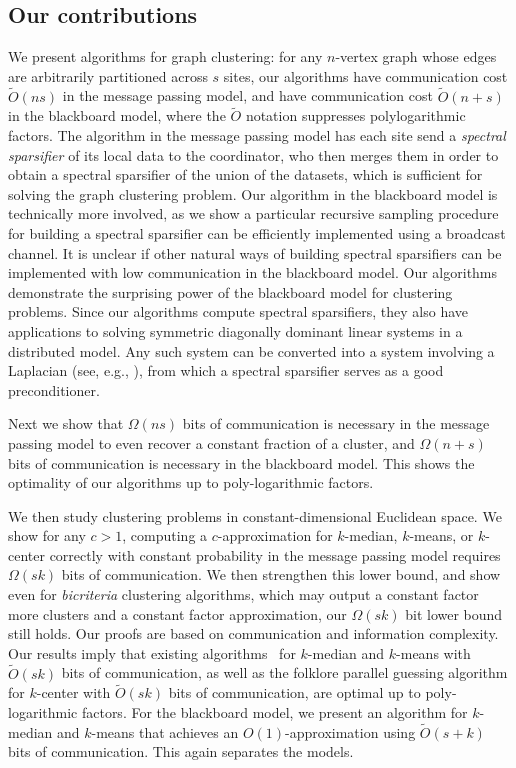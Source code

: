 \subsection{Our contributions}  
%
We present algorithms for graph clustering: for any $n$-vertex graph whose edges are arbitrarily partitioned across $s$ sites, our algorithms have communication cost $\tilde{O}(ns)$ in the message passing model, and have communication cost $\tilde{O}(n+s)$ in the blackboard model, where the $\tilde{O}$ notation suppresses polylogarithmic factors. The algorithm in the message passing model has each site send a {\it spectral sparsifier} of its local data to the coordinator, who then merges them in order to obtain a spectral sparsifier of the union of the datasets, which is sufficient for solving the graph clustering problem. Our algorithm in the blackboard model is technically more involved, as we show a particular recursive sampling procedure for building a spectral sparsifier can be efficiently implemented using a broadcast channel. It is unclear if other natural ways of building spectral sparsifiers can be implemented with low communication in the blackboard model. Our algorithms demonstrate the surprising power of the blackboard model for clustering problems. Since our algorithms compute spectral sparsifiers, they also have applications to solving symmetric diagonally dominant linear systems in a distributed model. Any such system can be converted into a system involving a Laplacian (see, e.g., \cite{ACKQWZ16}), from which a spectral sparsifier serves as a good preconditioner. 

Next we show that $\Omega(ns)$ bits of communication is necessary in the message passing model to even recover a constant fraction of a cluster, and $\Omega(n+s)$ bits of communication is necessary in the blackboard model. This shows the optimality of our algorithms up to poly-logarithmic factors. 

We then study clustering problems in constant-dimensional Euclidean space. We show for any $c>1$, computing a $c$-approximation for $k$-median, $k$-means, or $k$-center correctly with constant probability in the message passing model requires $\Omega(sk)$ bits of communication. We then strengthen this lower bound, and show even for {\it bicriteria} clustering algorithms, which may output a constant factor more clusters and a constant factor approximation, our $\Omega(sk)$ bit lower bound still holds. Our proofs are based on
communication and information complexity. 
Our results imply that existing algorithms~\cite{BEL13} for $k$-median and $k$-means with $\tilde{O}(sk)$ bits of communication, as well as the folklore parallel guessing algorithm for $k$-center with $\tilde{O}(sk)$ bits of communication, are optimal up to poly-logarithmic factors. For the blackboard model, we present an algorithm for $k$-median and $k$-means that achieves an $O(1)$-approximation using $\tilde{O}(s+k)$ bits of communication. This again separates the models.  


